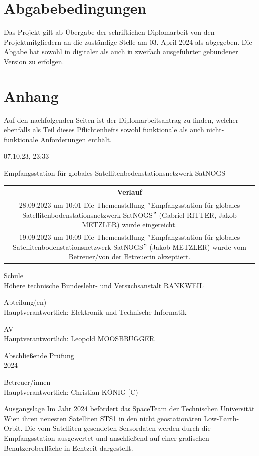 \section{Abgabebedingungen}
Das Projekt gilt ab Übergabe der schriftlichen Diplomarbeit von den Projektmitgliedern an die 
zuständige Stelle am 03. April 2024 als abgegeben. Die Abgabe hat sowohl in digitaler als auch in 
zweifach ausgeführter gebundener Version zu erfolgen. 

\section{Anhang}
Auf den nachfolgenden Seiten ist der Diplomarbeitsantrag zu finden, welcher ebenfalls als Teil dieses 
Pflichtenhefts sowohl funktionale als auch nicht-funktionale Anforderungen enthält.
\newpage

07.10.23, 23:33

{\huge Empfangsstation für globales Satellitenbodenstationsnetzwerk SatNOGS}

\begin{tabular}{|c|}
	\hline
	Verlauf \\
	\hline
	\parbox{\textwidth}{28.09.2023 um 10:01 Die Themenstellung $"$Empfangsstation für\\ globales Satellitenbodenstationsnetzwerk \\SatNOGS$"$ (Gabriel RITTER, Jakob METZLER) wurde eingereicht.}
	 \\
	\hline
	\parbox{\textwidth}{19.09.2023 um 10:09 Die Themenstellung $"$Empfangsstation für globales Satellitenbodenstationsnetzwerk SatNOGS$"$ (Jakob METZLER) wurde vom Betreuer/von der Betreuerin akzeptiert.} \\
	\hline
\end{tabular}

{\large Schule\\}
Höhere technische Bundeslehr- und Versuchsanstalt RANKWEIL

{\large Abteilung(en)\\}
Hauptverantwortlich: Elektronik und Technische Informatik

{\large AV\\}
Hauptverantwortlich: Leopold MOOSBRUGGER

{\large Abschließende Prüfung\\}
2024

{\large Betreuer/innen\\}
Hauptverantwortlich: Christian KÖNIG (C)

{\large Ausgangslage}
Im Jahr 2024 befördert das SpaceTeam der Technischen Universität Wien ihren neuesten Satelliten STS1 in den nicht geostationären Low-Earth-Orbit. Die vom Satelliten gesendeten Sensordaten werden durch die Empfangsstation ausgewertet und anschließend auf einer grafischen Benutzeroberfläche in Echtzeit dargestellt.

